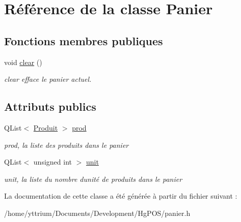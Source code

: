 \hypertarget{classPanier}{}\section{Référence de la classe Panier}
\label{classPanier}
\subsection*{Fonctions membres publiques}
\begin{DoxyCompactItemize}
\item 
\mbox{\label{classPanier_adc423444697a339bed7ba2e68eab3d21}} 
void \hyperlink{classPanier_adc423444697a339bed7ba2e68eab3d21}{clear} ()
\begin{DoxyCompactList}\small\item\em clear efface le panier actuel. \end{DoxyCompactList}\end{DoxyCompactItemize}
\subsection*{Attributs publics}
\begin{DoxyCompactItemize}
\item 
\mbox{\label{classPanier_a8f5aa56eb718268b34ce98c1c6f355d0}} 
Q\+List$<$ \hyperlink{classProduit}{Produit} $>$ \hyperlink{classPanier_a8f5aa56eb718268b34ce98c1c6f355d0}{prod}
\begin{DoxyCompactList}\small\item\em prod, la liste des produits dans le panier \end{DoxyCompactList}\item 
\mbox{\label{classPanier_ad7c7bd79f43a8686805302d091207e64}} 
Q\+List$<$ unsigned int $>$ \hyperlink{classPanier_ad7c7bd79f43a8686805302d091207e64}{unit}
\begin{DoxyCompactList}\small\item\em unit, la liste du nombre d\textquotesingle{}unité de produits dans le panier \end{DoxyCompactList}\end{DoxyCompactItemize}


La documentation de cette classe a été générée à partir du fichier suivant \+:\begin{DoxyCompactItemize}
\item 
/home/yttrium/\+Documents/\+Development/\+Hg\+P\+O\+S/panier.\+h\end{DoxyCompactItemize}
